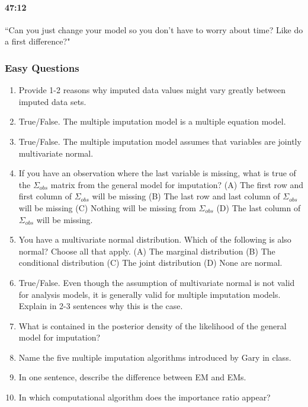 \documentclass[11pt]{article}
\begin{document}
\paragraph{47:12} ``Can you just change your model so you don't have to worry about time? Like do a first difference?"

\subsubsection{Easy Questions}
\begin{enumerate}
\item Provide 1-2 reasons why imputed data values might vary greatly between imputed data sets. %
\item True/False. The multiple imputation model is a multiple equation model. %
\item True/False. The multiple imputation model assumes that variables are jointly multivariate normal. %
\item If you have an observation where the last variable is missing, what is true of the $\Sigma_{obs}$ matrix from the general model for imputation? (A) The first row and first column of $\Sigma_{obs}$ will be missing (B) The last row and last column of $\Sigma_{obs}$ will be missing (C) Nothing will be missing from $\Sigma_{obs}$ (D) The last column of $\Sigma_{obs}$ will be missing. %
\item You have a multivariate normal distribution. Which of the following is also normal? Choose all that apply. (A) The marginal distribution (B) The conditional distribution (C) The joint distribution (D) None are normal. 
\item True/False. Even though the assumption of multivariate normal is not valid for analysis models, it is generally valid for multiple imputation models. Explain in 2-3 sentences why this is the case. %
\item What is contained in the posterior density of the likelihood of the general model for imputation? %
\item Name the five multiple imputation algorithms introduced by Gary in class.
\item In one sentence, describe the difference between EM and EMs.
\item In which computational algorithm does the importance ratio appear?

\end{enumerate}
\end{document}
